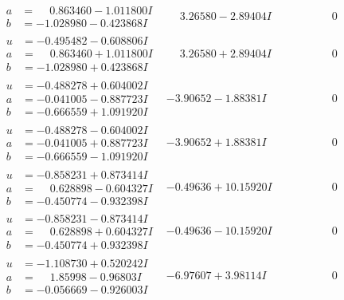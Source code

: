 \documentclass[1p]{elsarticle_modified}
\theoremstyle{definition}
\begin{document}
$$\begin{array}{c|c|c}
\begin{aligned}
a &= \phantom{-}0.863460 - 1.011800 I \\
b &= -1.028980 - 0.423868 I\end{aligned}
 & \phantom{-}3.26580 - 2.89404 I & \phantom{-0.000000 } 0 \\ \hline\begin{aligned}
u &= -0.495482 - 0.608806 I \\
a &= \phantom{-}0.863460 + 1.011800 I \\
b &= -1.028980 + 0.423868 I\end{aligned}
 & \phantom{-}3.26580 + 2.89404 I & \phantom{-0.000000 } 0 \\ \hline\begin{aligned}
u &= -0.488278 + 0.604002 I \\
a &= -0.041005 - 0.887723 I \\
b &= -0.666559 + 1.091920 I\end{aligned}
 & -3.90652 - 1.88381 I & \phantom{-0.000000 } 0 \\ \hline\begin{aligned}
u &= -0.488278 - 0.604002 I \\
a &= -0.041005 + 0.887723 I \\
b &= -0.666559 - 1.091920 I\end{aligned}
 & -3.90652 + 1.88381 I & \phantom{-0.000000 } 0 \\ \hline\begin{aligned}
u &= -0.858231 + 0.873414 I \\
a &= \phantom{-}0.628898 - 0.604327 I \\
b &= -0.450774 - 0.932398 I\end{aligned}
 & -0.49636 + 10.15920 I & \phantom{-0.000000 } 0 \\ \hline\begin{aligned}
u &= -0.858231 - 0.873414 I \\
a &= \phantom{-}0.628898 + 0.604327 I \\
b &= -0.450774 + 0.932398 I\end{aligned}
 & -0.49636 - 10.15920 I & \phantom{-0.000000 } 0 \\ \hline\begin{aligned}
u &= -1.108730 + 0.520242 I \\
a &= \phantom{-}1.85998 - 0.96803 I \\
b &= -0.056669 - 0.926003 I\end{aligned}
 & -6.97607 + 3.98114 I & \phantom{-0.000000 } 0 \\ \hline\begin{aligned}

\end{aligned}
\end{array}$$
\end{document}
